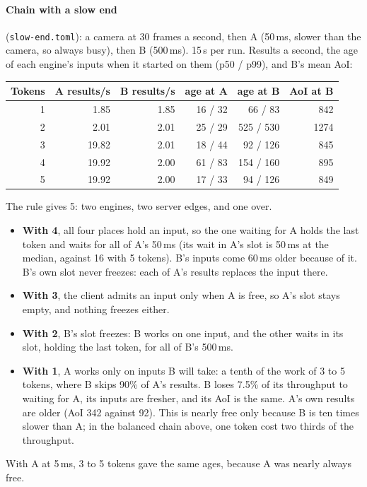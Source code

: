 \documentclass[11pt]{article}
\newcommand{\code}[1]{\texttt{#1}}
\begin{document}
\paragraph{Chain with a slow end} (\code{slow-end.toml}): a camera at 30 frames a second, then A
(50\,ms, slower than the camera, so always busy), then B (500\,ms). 15\,s per
run. Results a second, the age of each engine's inputs when it started on
them (p50 / p99), and B's mean AoI:
\begin{center}
\small
\begin{tabular}{@{}rrrrrr@{}}
\toprule
Tokens & A results/s & B results/s & age at A & age at B & AoI at B \\
\midrule
1 & 1.85  & 1.85 & 16 / 32 & 66 / 83   & 842 \\
2 & 2.01  & 2.01 & 25 / 29 & 525 / 530 & 1274 \\
3 & 19.82 & 2.01 & 18 / 44 & 92 / 126  & 845 \\
4 & 19.92 & 2.00 & 61 / 83 & 154 / 160 & 895 \\
5 & 19.92 & 2.00 & 17 / 33 & 94 / 126  & 849 \\
\bottomrule
\end{tabular}
\end{center}
The rule gives 5: two engines, two server edges, and one over.
\begin{itemize}[nosep]
  \item \textbf{With 4}, all four places hold an input, so the one waiting
        for A holds the last token and waits for all of A's 50\,ms (its wait
        in A's slot is 50\,ms at the median, against 16 with 5 tokens). B's
        inputs come 60\,ms older because of it. B's own slot never freezes:
        each of A's results replaces the input there.
  \item \textbf{With 3}, the client admits an input only when A is free, so
        A's slot stays empty, and nothing freezes either.
  \item \textbf{With 2}, B's slot freezes: B works on one input, and the
        other waits in its slot, holding the last token, for all of B's
        500\,ms.
  \item \textbf{With 1}, A works only on inputs B will take: a tenth of the
        work of 3 to 5 tokens, where B skips 90\% of A's results. B loses
        7.5\% of its throughput to waiting for A, its inputs are fresher, and
        its AoI is the same. A's own results are older (AoI 342 against 92).
        This is nearly free only because B is ten times slower than A; in the
        balanced chain above, one token cost two thirds of the throughput.
\end{itemize}
With A at 5\,ms, 3 to 5 tokens gave the same ages, because A was nearly
always free.
\end{document}
